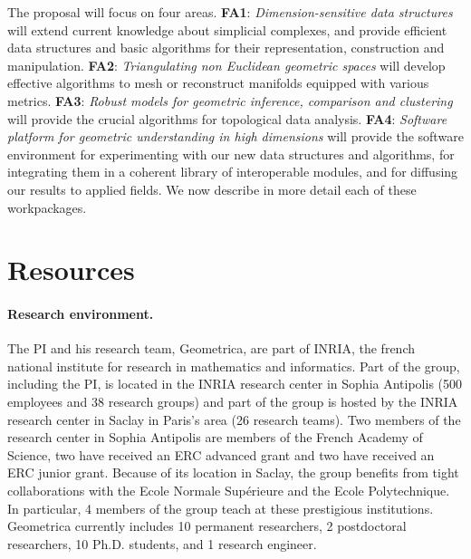 The proposal will focus on four areas. {\bf  FA1}:  {\em Dimension-sensitive data  structures} will extend current knowledge about simplicial complexes, and  provide efficient data structures and basic algorithms for their representation, construction and manipulation. 
  {\bf FA2}:  {\em Triangulating non Euclidean geometric spaces} will develop effective algorithms to mesh or reconstruct manifolds equipped with various metrics.   {\bf FA3}: {\em Robust models for geometric inference, comparison and  clustering} will provide the crucial  algorithms for topological data analysis.
 {\bf FA4}:  {\em  Software platform for geometric understanding in high dimensions} will provide the software environment for experimenting with our new data structures and algorithms, for integrating them in a coherent library of interoperable modules, and for diffusing our results to applied fields. We now describe in more detail each of these workpackages.




%








\section{Resources}

\paragraph{Research environment.}
The PI and his research team, Geometrica, are part of INRIA, the french national institute for research in mathematics and informatics. Part of the group, including the PI, is located in the INRIA research center in Sophia Antipolis  (500 employees and 38 research groups) and part of the group is hosted by the INRIA research center in Saclay in Paris's area (26 research teams). Two members of the research center in Sophia Antipolis are members of the French Academy of Science, two have received an ERC advanced grant and two have received an ERC junior grant. Because of its location in Saclay, the group benefits from tight collaborations with the Ecole Normale Sup\'erieure and the Ecole Polytechnique. In particular, 4 members of the group teach at these prestigious institutions. Geometrica currently includes 10 permanent researchers,  2 postdoctoral researchers, 10 Ph.D. students, and 1 research engineer. 

